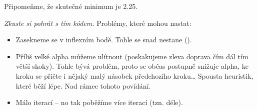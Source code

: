 Připomeňme, že skutečné minimum je 2.25.

\emph{
	Zkuste si pohrát s tím kódem.
}
Problémy, které mohou nastat:
\begin{itemize}

	\item  Zasekneme se v inflexním bodě. Tohle se snad nestane ().

	\item  Příliš velké alpha můžeme ulítnout (poskakujeme zleva doprava čím dál tím větší skoky).
		Tohle bývá problém, proto se občas postupně snižuje alpha, ke kroku se přičte i nějaký malý násobek předchozího kroku\ldots
		Spousta heuristik, které běží lépe.
		Nad rámec tohoto povídání.

	\item  Málo iterací -- no tak poběžíme více iterací (tzn. déle).

\end{itemize}

